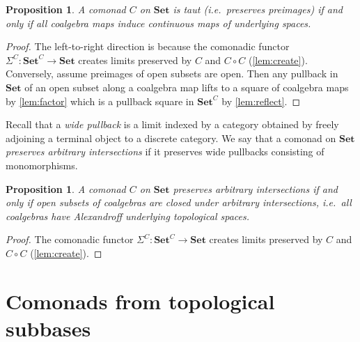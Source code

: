 \documentclass[11pt, oneside, article]{memoir}
\theoremstyle{plain}
\newtheorem{proposition}[theorem]{Proposition}
\theoremstyle{definition}
\newtheorem{definition}[def]{Definition}
\theoremstyle{remark}
\DeclarePairedDelimiter{\gen}{\langle}{\rangle}
\newcommand{\namedcat}[1]{\mathbf{#1}}
\newcommand{\spa}[1]{\mathbf{#1}}
\newcommand{\Set}{\namedcat{Set}}
\newcommand{\CoalgOn}[2]{{#2}^{#1}}
\newcommand{\CoalgSet}[1]{\CoalgOn{#1}{\Set}}
\newcommand{\carr}{\Sigma}
\newcommand{\car}[1]{\carr^{#1}}
\newcommand{\carC}{\car{\cC}}
\newcommand{\ph}[1]{#1}
\newcommand{\topbasis}[1]{\pP_{#1}}
\newcommand{\cmnd}[1]{{#1}}
\newcommand{\cC}{\cmnd{C}}
\newcommand{\pP}{\ph{P}}
\newcommand{\tX}{\spa{X}}
\newcommand{\CSet}{\CoalgSet{\cC}}
\newcommand{\opens}[1]{\mathcal{O}(#1)}
\begin{document}
\begin{proposition}\label{prop:tautpreimages}
  A comonad $\cC$ on $\Set$ is taut (i.e.\ preserves preimages) if and
  only if all coalgebra maps induce continuous maps of underlying
  spaces.
\end{proposition}
\begin{proof}
  The left-to-right direction is because the comonadic functor
  $\carC \colon \CSet \to \Set$ creates limits preserved by $\cC$ and
  $\cC \circ \cC$ (\cref{lem:create}). Conversely, assume preimages of
  open subsets are open. Then any pullback in $\Set$ of an open subset
  along a coalgebra map lifts to a square of coalgebra maps by
  \cref{lem:factor} which is a pullback square in $\CSet$ by
  \cref{lem:reflect}.
\end{proof}

Recall that a \emph{wide pullback} is a limit indexed by a category
obtained by freely adjoining a terminal object to a discrete
category. We say that a comonad on $\Set$ \emph{preserves arbitrary
  intersections} if it preserves wide pullbacks consisting of
monomorphisms.

\begin{proposition}\label{prop:alextop}
  A comonad $\cC$ on $\Set$ preserves arbitrary intersections if and
  only if open subsets of coalgebras are closed under arbitrary
  intersections, i.e.\ all coalgebras have Alexandroff underlying
  topological spaces.
\end{proposition}
\begin{proof}
  The comonadic functor $\carC \colon \CSet \to \Set$ creates limits
  preserved by $\cC$ and $\cC \circ \cC$ (\cref{lem:create}).
\end{proof}

\section{Comonads from topological subbases}\label{sec:comonadtotop}


\end{document}
